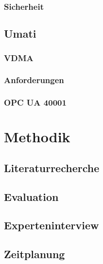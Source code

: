 \documentclass[a4paper, 12pt, oneside]{scrbook}
\begin{document}
		
		\subsection{Sicherheit}
		
	
	\section{Umati}
	
	
		\subsection{VDMA}
		\subsection{Anforderungen}
		\subsection{OPC UA 40001}
		
		
	
\chapter{Methodik}
	
	
	
	\section{Literaturrecherche}
	
	\section{Evaluation}
	
	\section{Experteninterview}
	
	\section{Zeitplanung}
	
\end{document}
